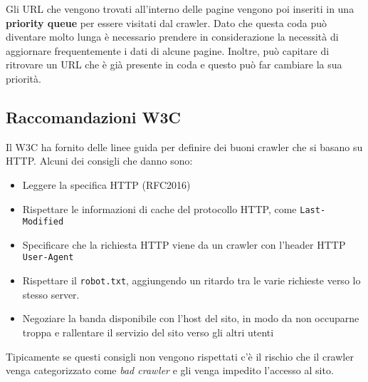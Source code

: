 Gli URL che vengono trovati all'interno delle pagine vengono poi inseriti in una \textbf{priority queue} per essere visitati dal crawler. 
Dato che questa coda può diventare molto lunga è necessario prendere in considerazione la necessità di aggiornare frequentemente i dati di alcune pagine.
Inoltre, può capitare di ritrovare un URL che è già presente in coda e questo può far cambiare la sua priorità.

\subsection{Raccomandazioni W3C}

Il W3C ha fornito delle linee guida per definire dei buoni crawler che si basano su HTTP.
Alcuni dei consigli che danno sono:

\begin{itemize}
	\item Leggere la specifica HTTP (RFC2016)
	\item Rispettare le informazioni di cache del protocollo HTTP, come \texttt{Last-Modified}
	\item Specificare che la richiesta HTTP viene da un crawler con l'header HTTP \texttt{User-Agent}
	\item Rispettare il \texttt{robot.txt}, aggiungendo un ritardo tra le varie richieste verso lo stesso server.
	\item Negoziare la banda disponibile con l'host del sito, in modo da non occuparne troppa e rallentare il servizio del sito verso gli altri utenti
\end{itemize}

\noindent Tipicamente se questi consigli non vengono rispettati c'è il rischio che il crawler venga categorizzato come \textit{bad crawler} e gli venga impedito l'accesso al sito.












